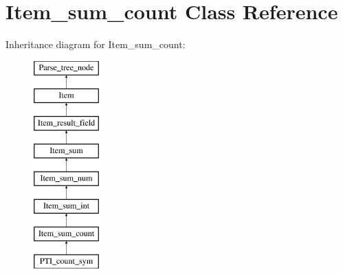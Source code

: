 \hypertarget{classItem__sum__count}{}\section{Item\+\_\+sum\+\_\+count Class Reference}
\label{classItem__sum__count}
Inheritance diagram for Item\+\_\+sum\+\_\+count\+:\begin{figure}[H]
\begin{center}
\leavevmode
\includegraphics[height=8.000000cm]{classItem__sum__count}
\end{center}
\end{figure}
